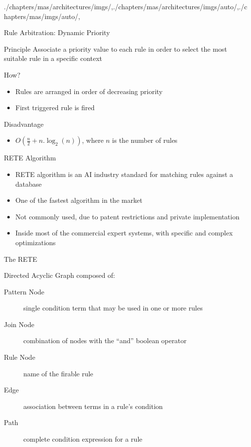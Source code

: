 \begin{graphicspathcontext}{{./chapters/mas/architectures/imgs/},{./chapters/mas/architectures/imgs/auto/},{./chapters/mas/imgs/auto/},\old}
\begin{frame}{{Rule Arbitration:} Dynamic Priority}
	\begin{block}{Principle}
		Associate a priority value to each rule in order to select the most suitable rule in a specific context
	\end{block}
	\begin{block}{How?}
		\begin{itemize}
			\item Rules are arranged in order of decreasing priority
			\item First triggered rule is fired
		\end{itemize}
	\end{block}
	\begin{alertblock}{Disadvantage}
		\begin{itemize}
			\item $O(\frac{n}{2} + n.\log_2(n))$, where $n$ is the number of rules
		\end{itemize}
	\end{alertblock}
\end{frame}

\begin{frame}{RETE Algorithm}
	\begin{itemize}
		\item RETE algorithm is an AI industry standard for matching rules against a database
		\vspace{.5cm}
		\item One of the fastest algorithm in the market
		\vspace{.5cm}
		\item Not commonly used, due to patent restrictions and private implementation
		\vspace{.5cm}
		\item Inside most of the commercial expert systems, with specific and complex optimizations
	\end{itemize}
\end{frame}

\begin{frame}{The RETE}
	\begin{definition}Directed Acyclic Graph composed of:
		\begin{description}
			\item[Pattern Node] single condition term that may be used in one or more rules
			\item[Join Node] combination of nodes with the ``and'' boolean operator
			\item[Rule Node] name of the firable rule
			\item[Edge] association between terms in a rule's condition
			\item[Path] complete condition expression for a rule
		\end{description}
	\end{definition}
	\vspace{.5cm}
\end{frame}


\end{graphicspathcontext}
